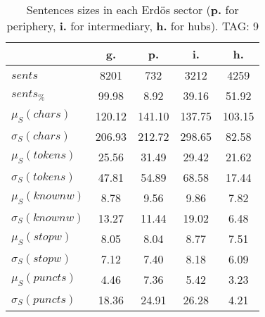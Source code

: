 \begin{table}[h!]
\begin{center}
\begin{tabular}{| l | c | c | c | c |}\hline
 & g. & p. & i. & h. \\\hline
$sents$ & 8201  & 732  & 3212  & 4259 \\\hline
$sents_{\%}$ & 99.98  & 8.92  & 39.16  & 51.92 \\\hline
$\mu_S(chars)$ & 120.12  & 141.10  & 137.75  & 103.15 \\\hline
$\sigma_S(chars)$ & 206.93  & 212.72  & 298.65  & 82.58 \\\hline
$\mu_S(tokens)$ & 25.56  & 31.49  & 29.42  & 21.62 \\\hline
$\sigma_S(tokens)$ & 47.81  & 54.89  & 68.58  & 17.44 \\\hline
$\mu_S(knownw)$ & 8.78  & 9.56  & 9.86  & 7.82 \\\hline
$\sigma_S(knownw)$ & 13.27  & 11.44  & 19.02  & 6.48 \\\hline
$\mu_S(stopw)$ & 8.05  & 8.04  & 8.77  & 7.51 \\\hline
$\sigma_S(stopw)$ & 7.12  & 7.40  & 8.18  & 6.09 \\\hline
$\mu_S(puncts)$ & 4.46  & 7.36  & 5.42  & 3.23 \\\hline
$\sigma_S(puncts)$ & 18.36  & 24.91  & 26.28  & 4.21 \\\hline
\end{tabular}
\caption{Sentences sizes in each Erd\"os sector ({{\bf p.}} for periphery, {{\bf i.}} for intermediary, {{\bf h.}} for hubs). TAG: 9}
\end{center}
\end{table}